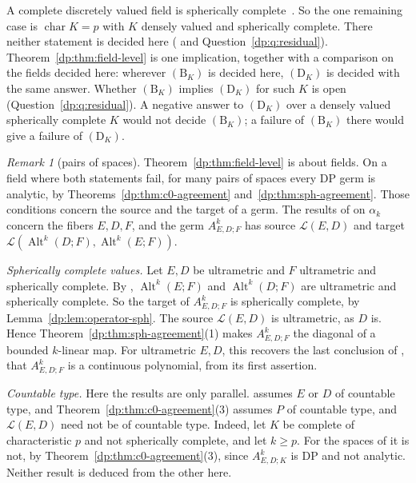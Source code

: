 \documentclass[11pt]{amsart}
\theoremstyle{definition}
\theoremstyle{remark}
\newtheorem{remark}[theorem]{Remark}
\numberwithin{equation}{section}
\newcommand{\cL}{\mathcal L}
\newcommand{\Alt}{\operatorname{Alt}}
\theoremstyle{plain}
\theoremstyle{definition}
\theoremstyle{plain}
\begin{document}
A complete discretely valued field is spherically complete~\cite[Lemma~D.1]{I}. So the one remaining case is $\operatorname{char}K=p$ with $K$ densely valued and spherically complete. There neither statement is decided here (\cite[Section~12]{I} and Question~\ref{dp:q:residual}). Theorem~\ref{dp:thm:field-level} is one implication, together with a comparison on the fields decided here: wherever $(\mathrm B_K)$ is decided here, $(\mathrm D_K)$ is decided with the same answer. Whether $(\mathrm B_K)$ implies $(\mathrm D_K)$ for such $K$ is open (Question~\ref{dp:q:residual}). A negative answer to $(\mathrm D_K)$ over a densely valued spherically complete $K$ would not decide $(\mathrm B_K)$; a failure of $(\mathrm B_K)$ there would give a failure of $(\mathrm D_K)$.

\begin{remark}[pairs of spaces]\label{dp:rem:field-level-spaces}
Theorem~\ref{dp:thm:field-level} is about fields. On a field where both statements fail, for many pairs of spaces every DP germ is analytic, by Theorems~\ref{dp:thm:c0-agreement} and~\ref{dp:thm:sph-agreement}. Those conditions concern the source and the target of a germ. The results of \cite{I} on $\alpha_k$ concern the fibers $E,D,F$, and the germ $A^k_{E,D;F}$ has source $\cL(E,D)$ and target $\cL(\Alt^k(D;F),\Alt^k(E;F))$.

\emph{Spherically complete values.} Let $E,D$ be ultrametric and $F$ ultrametric and spherically complete. By \cite[Theorem~5.2]{I}, $\Alt^k(E;F)$ and $\Alt^k(D;F)$ are ultrametric and spherically complete. So the target of $A^k_{E,D;F}$ is spherically complete, by Lemma~\ref{dp:lem:operator-sph}. The source $\cL(E,D)$ is ultrametric, as $D$ is. Hence Theorem~\ref{dp:thm:sph-agreement}(1) makes $A^k_{E,D;F}$ the diagonal of a bounded $k$\nobreakdash-linear map. For ultrametric $E,D$, this recovers the last conclusion of \cite[Theorem~5.2]{I}, that $A^k_{E,D;F}$ is a continuous polynomial, from its first assertion.

\emph{Countable type.} Here the results are only parallel. \cite[Corollary~10.5]{I} assumes $E$ or $D$ of countable type, and Theorem~\ref{dp:thm:c0-agreement}(3) assumes $P$ of countable type, and $\cL(E,D)$ need not be of countable type. Indeed, let $K$ be complete of characteristic $p$ and not spherically complete, and let $k\ge p$. For the spaces of \cite[Theorem~7.2(2)]{I} it is not, by Theorem~\ref{dp:thm:c0-agreement}(3), since $A^k_{E,D;K}$ is DP and not analytic. Neither result is deduced from the other here.
\end{remark}
\end{document}
